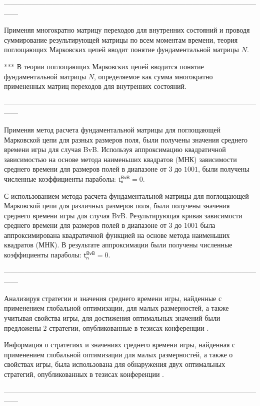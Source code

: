 ------------------------------------------------------------------------------------------------------------------

Применяя многократно матрицу переходов для внутренних состояний и проводя суммирование результирующей матрицы по всем моментам времени, теория поглощающих Марковских цепей вводит понятие фундаментальной матрицы $N$.

***
В теории поглощающих Марковских цепей вводится понятие фундаментальной матрицы $N$, определяемое как сумма многократно примененных матриц переходов для внутренних состояний.

------------------------------------------------------------------------------------------------------------------

Применяя метод расчета фундаментальной матрицы для поглощающей Марковской цепи для разных размеров поля, были получены значения среднего времени игры для случая BvB. Используя аппроксимацию квадратичной зависимостью на основе метода наименьших квадратов (МНК) зависимости среднего времени для размеров полей в диапазоне от $3$ до $1001$, были получены численные коэффициенты параболы: $\boldsymbol{\mathsf{t_n^{BvB}}} = 0$.


С использованием метода расчета фундаментальной матрицы для поглощающей Марковской цепи для различных размеров поля, были получены значения среднего времени игры для случая BvB. Результирующая кривая зависимости среднего времени для размеров полей в диапазоне от $3$ до $1001$ была аппроксимирована квадратичной функцией на основе метода наименьших квадратов (МНК). В результате аппроксимации были получены численные коэффициенты параболы: $\boldsymbol{\mathsf{t_n^{BvB}}} = 0$.

------------------------------------------------------------------------------------------------------------------

Анализируя стратегии и значения среднего времени игры, найденные с применением глобальной оптимизации, для малых размерностей, а также учитывая свойства игры, для достижения оптимальных значений были предложены $2$ стратегии, опубликованные в тезисах конференции \cite{confbib1}.


Информация о стратегиях и значениях среднего времени игры, найденная с применением глобальной оптимизации для малых размерностей, а также о свойствах игры, была использована для обнаружения двух оптимальных стратегий, опубликованных в тезисах конференции \cite{confbib1}.


------------------------------------------------------------------------------------------------------------------

